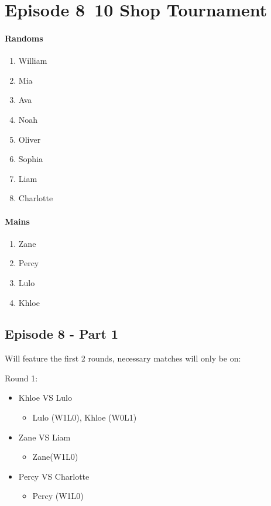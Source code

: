 \documentclass[12pt, letterpaper]{article}
\begin{document}
\section*{Episode 8~10 Shop Tournament}
\paragraph{Randoms}
\begin{enumerate}
   \item William
   \item Mia
   \item Ava
   \item Noah
   \item Oliver
   \item Sophia
   \item Liam
   \item Charlotte
\end{enumerate}

\paragraph{Mains}
\begin{enumerate}
   \item Zane
   \item Percy
   \item Lulo
   \item Khloe
\end{enumerate}

\subsection*{Episode 8 - Part 1}
Will feature the first 2 rounds, necessary matches will only be on:
\par \noindent Round 1:
\begin{itemize}
   \item Khloe VS Lulo
   \begin{itemize}
      \item Lulo (W1L0), Khloe (W0L1)
   \end{itemize}
   \item Zane VS Liam
   \begin{itemize}
      \item Zane(W1L0)
   \end{itemize}
   \item Percy VS Charlotte
   \begin{itemize}
      \item Percy (W1L0)
   \end{itemize}
\end{itemize}
\end{document}
